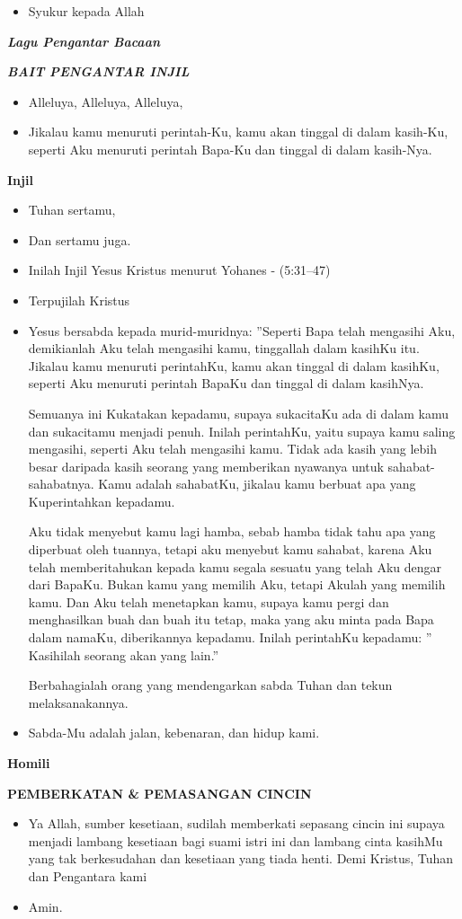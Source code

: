 \documentclass[12pt,twoside,anypage]{scrbook}
\makeatletter
\newcommand{\subjudul}[1]{%
  {\parindent \z@ \normalfont
    \interlinepenalty\@M \bfseries #1\par\nobreak \vskip 20\p@ }}
\newcommand{\lagu}[1]{%
  {\parindent \z@ \normalfont
    \interlinepenalty\@M \bfseries \emph{#1}\par\nobreak \vskip 20\p@ }}
\newcommand{\BU}[1]{\begin{itemize} \item[U:] #1 \end{itemize}}
\newcommand{\BI}[1]{\begin{itemize} \item[I:] #1 \end{itemize}}
\makeatother
\begin{document}
\BU{Syukur kepada Allah}

\lagu{Lagu Pengantar Bacaan}


\small
\lagu{BAIT PENGANTAR INJIL}
\BI{Alleluya, Alleluya, Alleluya,}
  
\BI{Jikalau kamu menuruti perintah-Ku, kamu akan tinggal di dalam kasih-Ku, seperti Aku menuruti perintah Bapa-Ku dan tinggal di dalam kasih-Nya.}
\normalsize

\subjudul{Injil}
\BI{Tuhan sertamu,}
\BU{Dan sertamu juga.}
\BI{Inilah Injil Yesus Kristus menurut Yohanes - (5:31--47)}
\BU{Terpujilah Kristus}

\BI{Yesus bersabda kepada murid-muridnya: 
				”Seperti Bapa telah mengasihi Aku, demikianlah Aku telah mengasihi kamu, tinggallah dalam kasihKu itu. Jikalau kamu menuruti perintahKu, kamu akan tinggal di dalam kasihKu, seperti Aku menuruti perintah BapaKu dan tinggal di dalam kasihNya.
				 
				Semuanya ini Kukatakan kepadamu, supaya sukacitaKu ada di dalam kamu dan sukacitamu menjadi penuh. Inilah perintahKu, yaitu supaya kamu saling mengasihi, seperti Aku telah mengasihi kamu. Tidak ada kasih yang lebih besar daripada kasih seorang yang memberikan nyawanya untuk sahabat-sahabatnya. Kamu adalah sahabatKu, jikalau kamu berbuat apa yang Kuperintahkan kepadamu.

				Aku tidak menyebut kamu lagi hamba, sebab hamba tidak tahu apa yang diperbuat oleh tuannya, tetapi aku menyebut kamu sahabat, karena Aku telah memberitahukan kepada kamu segala sesuatu yang telah Aku dengar dari BapaKu. Bukan kamu yang memilih Aku, tetapi Akulah yang memilih kamu. Dan Aku telah menetapkan kamu, supaya kamu pergi dan menghasilkan buah dan buah itu tetap, maka yang aku minta pada Bapa dalam namaKu, diberikannya kepadamu. 
				Inilah perintahKu kepadamu: ” Kasihilah seorang akan yang lain.”

Berbahagialah orang yang mendengarkan sabda Tuhan dan tekun melaksanakannya. }

\BU{Sabda-Mu adalah jalan, kebenaran, dan hidup kami.}


\subjudul{Homili}

\subjudul{PEMBERKATAN \& PEMASANGAN CINCIN}

\BI{Ya Allah, sumber kesetiaan, sudilah memberkati sepasang cincin ini supaya menjadi lambang kesetiaan bagi suami istri ini dan lambang cinta kasihMu yang tak berkesudahan dan kesetiaan yang tiada henti. Demi Kristus, Tuhan dan Pengantara kami}
\BU{Amin.}
\end{document}

